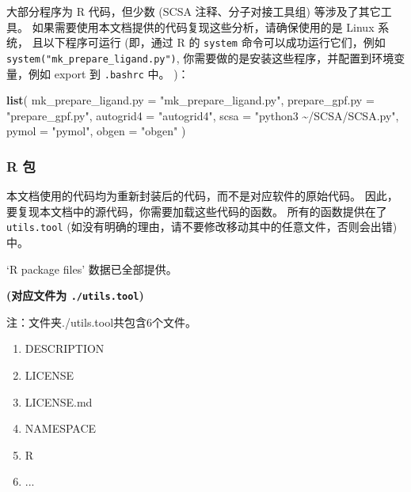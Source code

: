 \documentclass[
]{article}
\newenvironment{Shaded}{\begin{snugshade}}{\end{snugshade}}
\newcommand{\DataTypeTok}[1]{\textcolor[rgb]{0.13,0.29,0.53}{#1}}
\newcommand{\KeywordTok}[1]{\textcolor[rgb]{0.13,0.29,0.53}{\textbf{#1}}}
\newcommand{\NormalTok}[1]{#1}
\newcommand{\StringTok}[1]{\textcolor[rgb]{0.31,0.60,0.02}{#1}}
\providecommand{\tightlist}{%
  \setlength{\itemsep}{0pt}\setlength{\parskip}{0pt}}
\begin{document}
大部分程序为 R 代码，但少数 (SCSA 注释、分子对接工具组) 等涉及了其它工具。
如果需要使用本文档提供的代码复现这些分析，请确保使用的是 Linux 系统，
且以下程序可运行
(即，通过 R 的 \texttt{system} 命令可以成功运行它们，例如 \texttt{system("mk\_prepare\_ligand.py")},
你需要做的是安装这些程序，并配置到环境变量，例如 export 到 \texttt{.bashrc} 中。
)：

\begin{Shaded}
\begin{Highlighting}[]
\KeywordTok{list}\NormalTok{(}
  \DataTypeTok{mk\_prepare\_ligand.py =} \StringTok{"mk\_prepare\_ligand.py"}\NormalTok{,}
  \DataTypeTok{prepare\_gpf.py =} \StringTok{"prepare\_gpf.py"}\NormalTok{,}
  \DataTypeTok{autogrid4 =} \StringTok{"autogrid4"}\NormalTok{,}
  \DataTypeTok{scsa =} \StringTok{"python3 \textasciitilde{}/SCSA/SCSA.py"}\NormalTok{,}
  \DataTypeTok{pymol =} \StringTok{"pymol"}\NormalTok{,}
  \DataTypeTok{obgen =} \StringTok{"obgen"}
\NormalTok{)}
\end{Highlighting}
\end{Shaded}

\hypertarget{r-ux5305}{%
\subsubsection{R 包}\label{r-ux5305}}

本文档使用的代码均为重新封装后的代码，而不是对应软件的原始代码。
因此，要复现本文档中的源代码，你需要加载这些代码的函数。
所有的函数提供在了 \texttt{utils.tool} (如没有明确的理由，请不要修改移动其中的任意文件，否则会出错) 中。

`R package files' 数据已全部提供。

\textbf{(对应文件为 \texttt{./utils.tool})}

\begin{center}\begin{tcolorbox}[colback=gray!10, colframe=gray!50, width=0.9\linewidth, arc=1mm, boxrule=0.5pt]注：文件夹./utils.tool共包含6个文件。

\begin{enumerate}\tightlist
\item DESCRIPTION
\item LICENSE
\item LICENSE.md
\item NAMESPACE
\item R
\item ...
\end{enumerate}\end{tcolorbox}
\end{center}
\end{document}
